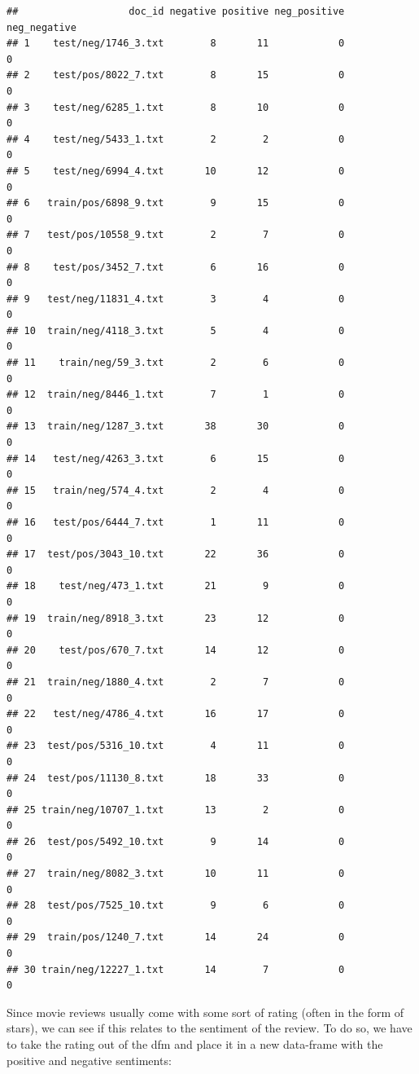 \documentclass[
]{book}
\begin{document}
\begin{verbatim}
##                   doc_id negative positive neg_positive neg_negative
## 1    test/neg/1746_3.txt        8       11            0            0
## 2    test/pos/8022_7.txt        8       15            0            0
## 3    test/neg/6285_1.txt        8       10            0            0
## 4    test/neg/5433_1.txt        2        2            0            0
## 5    test/neg/6994_4.txt       10       12            0            0
## 6   train/pos/6898_9.txt        9       15            0            0
## 7   test/pos/10558_9.txt        2        7            0            0
## 8    test/pos/3452_7.txt        6       16            0            0
## 9   test/neg/11831_4.txt        3        4            0            0
## 10  train/neg/4118_3.txt        5        4            0            0
## 11    train/neg/59_3.txt        2        6            0            0
## 12  train/neg/8446_1.txt        7        1            0            0
## 13  train/neg/1287_3.txt       38       30            0            0
## 14   test/neg/4263_3.txt        6       15            0            0
## 15   train/neg/574_4.txt        2        4            0            0
## 16   test/pos/6444_7.txt        1       11            0            0
## 17  test/pos/3043_10.txt       22       36            0            0
## 18    test/neg/473_1.txt       21        9            0            0
## 19  train/neg/8918_3.txt       23       12            0            0
## 20    test/pos/670_7.txt       14       12            0            0
## 21  train/neg/1880_4.txt        2        7            0            0
## 22   test/neg/4786_4.txt       16       17            0            0
## 23  test/pos/5316_10.txt        4       11            0            0
## 24  test/pos/11130_8.txt       18       33            0            0
## 25 train/neg/10707_1.txt       13        2            0            0
## 26  test/pos/5492_10.txt        9       14            0            0
## 27  train/neg/8082_3.txt       10       11            0            0
## 28  test/pos/7525_10.txt        9        6            0            0
## 29  train/pos/1240_7.txt       14       24            0            0
## 30 train/neg/12227_1.txt       14        7            0            0
\end{verbatim}

Since movie reviews usually come with some sort of rating (often in the form of stars), we can see if this relates to the sentiment of the review. To do so, we have to take the rating out of the dfm and place it in a new data-frame with the positive and negative sentiments:
\end{document}
